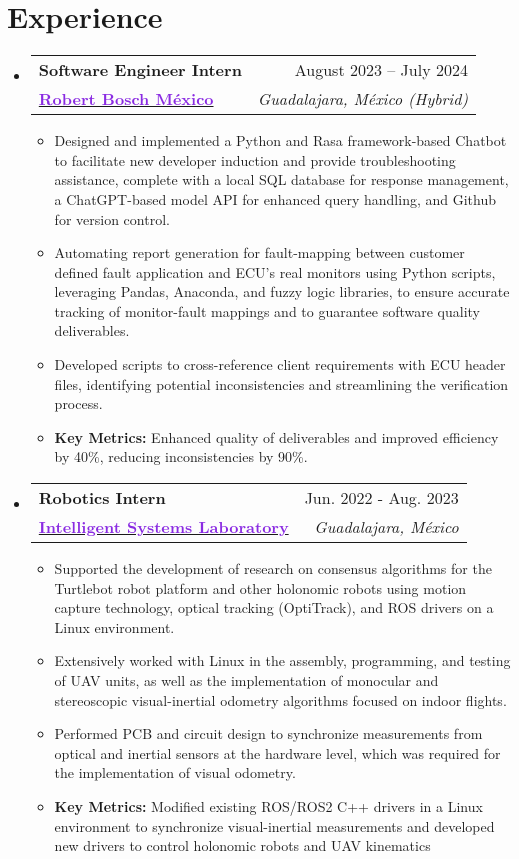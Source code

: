 \documentclass[a4paper,11pt]{article}
\makeatletter
\newcommand{\resumeItem}[1]{
  \item\small{
    {#1 \vspace{-2pt}}
  }
}
\newcommand{\resumeItemNoBullet}[1]{
  \item[]\small{
    {#1 \vspace{-2pt}}
  }
}
\newcommand{\resumeSubheadingNoItalics}[4]{
  \vspace{-2pt}\item
    \begin{tabular*}{1\textwidth}[t]{l@{\extracolsep{\fill}}r}
      \textbf{#1} & #2 \\
      \small#3 & \textit{\small #4} \\
    \end{tabular*}\vspace{-2pt}
}
\newcommand{\resumeSubHeadingListStart}{\begin{itemize}[leftmargin=0in, label={}]}
\newcommand{\resumeSubHeadingListEnd}{\end{itemize}}
\newcommand{\resumeItemListStart}{\begin{itemize}[leftmargin=0.15in, nosep]}
\newcommand{\resumeItemListEnd}{\end{itemize}\vspace{-2pt}}
\makeatother
\begin{document}
\section{\Large{Experience}}
  \resumeSubHeadingListStart
    \resumeSubheadingNoItalics
      {Software Engineer Intern}{August 2023 -- July 2024}
      {\href{https://bosch.com.mx}{\textcolor{BlueViolet}{\textbf{\large{Robert Bosch México}}}}}{Guadalajara, México (Hybrid)}
      \resumeItemListStart
        \resumeItem{Designed and implemented a Python and Rasa framework-based Chatbot to facilitate new developer induction and provide troubleshooting assistance, complete with a local SQL database for response management, a ChatGPT-based model API for enhanced query handling, and Github for version control.}
        \resumeItem{Automating report generation for fault-mapping between customer defined fault application and ECU's  real monitors using Python scripts, leveraging Pandas, Anaconda, and fuzzy logic libraries, to ensure accurate tracking of monitor-fault mappings and to guarantee software quality deliverables.}
        \resumeItem{Developed scripts to cross-reference client requirements with ECU header files, identifying potential inconsistencies and streamlining the verification process.}
        \resumeItemNoBullet{\textbf{Key Metrics:} Enhanced quality of deliverables and improved efficiency by 40\%, reducing inconsistencies by 90\%.}
      \resumeItemListEnd
    \vspace{-2pt}
    \resumeSubheadingNoItalics
      {Robotics Intern}{Jun. 2022 - Aug. 2023}
      {\href{https://www.cucei.udg.mx/carreras/robotica/es/laboratorios/ciber-fisicos}{\textcolor{BlueViolet}{\textbf{\large{Intelligent Systems Laboratory}}}}}{Guadalajara, México}
      \resumeItemListStart
        \resumeItem{Supported the development of research on consensus algorithms for the Turtlebot robot platform and other holonomic robots using motion capture technology, optical tracking (OptiTrack), and ROS drivers on a Linux environment.}
        \resumeItem{Extensively worked with Linux in the assembly, programming, and testing of UAV units, as well as the implementation of monocular and stereoscopic visual-inertial odometry algorithms focused on indoor flights.}
        \resumeItem{Performed PCB and circuit design to synchronize measurements from optical and inertial sensors at the hardware level, which was required for the implementation of visual odometry.}
        \resumeItemNoBullet{\textbf{Key Metrics:} Modified existing ROS/ROS2 C++ drivers in a Linux environment to synchronize visual-inertial measurements and developed new drivers to control holonomic robots and UAV kinematics}
      \resumeItemListEnd
  \resumeSubHeadingListEnd
\end{document}
